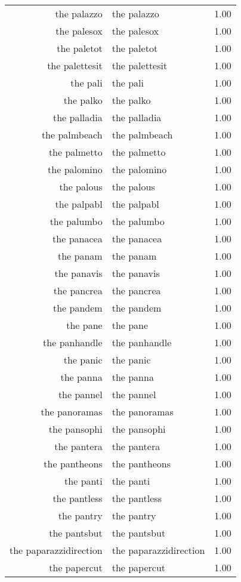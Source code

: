\begin{table}[ht]
\begin{tabular}{rlr}
  the palazzo & the palazzo & 1.00 \\ 
  the palesox & the palesox & 1.00 \\ 
  the paletot & the paletot & 1.00 \\ 
  the palettesit & the palettesit & 1.00 \\ 
  the pali & the pali & 1.00 \\ 
  the palko & the palko & 1.00 \\ 
  the palladia & the palladia & 1.00 \\ 
  the palmbeach & the palmbeach & 1.00 \\ 
  the palmetto & the palmetto & 1.00 \\ 
  the palomino & the palomino & 1.00 \\ 
  the palous & the palous & 1.00 \\ 
  the palpabl & the palpabl & 1.00 \\ 
  the palumbo & the palumbo & 1.00 \\ 
  the panacea & the panacea & 1.00 \\ 
  the panam & the panam & 1.00 \\ 
  the panavis & the panavis & 1.00 \\ 
  the pancrea & the pancrea & 1.00 \\ 
  the pandem & the pandem & 1.00 \\ 
  the pane & the pane & 1.00 \\ 
  the panhandle & the panhandle & 1.00 \\ 
  the panic & the panic & 1.00 \\ 
  the panna & the panna & 1.00 \\ 
  the pannel & the pannel & 1.00 \\ 
  the panoramas & the panoramas & 1.00 \\ 
  the pansophi & the pansophi & 1.00 \\ 
  the pantera & the pantera & 1.00 \\ 
  the pantheons & the pantheons & 1.00 \\ 
  the panti & the panti & 1.00 \\ 
  the pantless & the pantless & 1.00 \\ 
  the pantry & the pantry & 1.00 \\ 
  the pantsbut & the pantsbut & 1.00 \\ 
  the paparazzidirection & the paparazzidirection & 1.00 \\ 
  the papercut & the papercut & 1.00 \\ 

\end{tabular}
\end{table}
